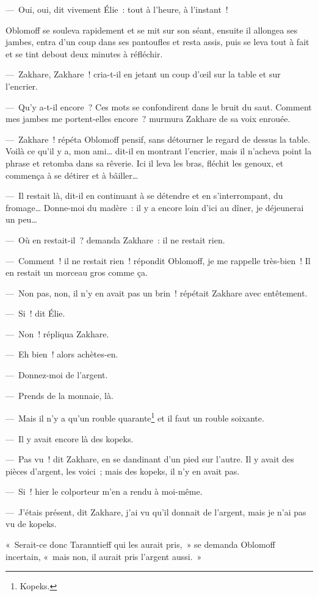 \documentclass[french,twoside]{book} %
\begin{document}
— Oui, oui, dit vivement Élie : tout à l’heure, à l’instant !\par
Oblomoff se souleva rapidement et se mit sur son séant, ensuite il allongea ses jambes, entra d’un coup dans ses pantoufles et resta assis, puis se leva tout à fait et se tint debout deux minutes à réfléchir.\par
— Zakhare, Zakhare ! cria-t-il en jetant un coup d’œil sur la table et sur l’encrier.\par
— Qu’y a-t-il encore ? Ces mots se confondirent dans le bruit du saut. Comment mes jambes me portent-elles encore ? murmura Zakhare de sa voix enrouée.\par
— Zakhare ! répéta Oblomoff pensif, sans détourner le regard de dessus la table. Voilà ce qu’il y a, mon ami… dit-il en montrant l’encrier, mais il n’acheva point la phrase et retomba dans sa rêverie. Ici il leva les bras, fléchit les genoux, et commença à se détirer et à bâiller…\par
— Il restait là, dit-il en continuant à se détendre et en s’interrompant, du fromage… Donne-moi du madère : il y a encore loin d’ici au dîner, je déjeunerai un peu…\par
— Où en restait-il ? demanda Zakhare : il ne restait rien.\par
— Comment ! il ne restait rien ! répondit Oblomoff, je me rappelle très-bien ! Il en restait un morceau gros comme ça.\par
— Non pas, non, il n’y en avait pas un brin ! répétait Zakhare avec entêtement.\par
— Si ! dit Élie.\par
— Non ! répliqua Zakhare.\par
— Eh bien ! alors achètes-en.\par
— Donnez-moi de l’argent.\par
— Prends de la monnaie, là.\par
— Mais il n’y a qu’un rouble quarante\footnote{Kopeks.} et il faut un rouble soixante.\par
— Il y avait encore là des kopeks.\par
— Pas vu ! dit Zakhare, en se dandinant d’un pied sur l’autre. Il y avait des pièces d’argent, les voici ; mais des kopeks, il n’y en avait pas.\par
— Si ! hier le colporteur m’en a rendu à moi-même.\par
— J’étais présent, dit Zakhare, j’ai vu qu’il donnait de l’argent, mais je n’ai pas vu de kopeks.\par
« Serait-ce donc Taranntieff qui les aurait pris, » se demanda Oblomoff incertain, « mais non, il aurait pris l’argent aussi. »\par
\end{document}
